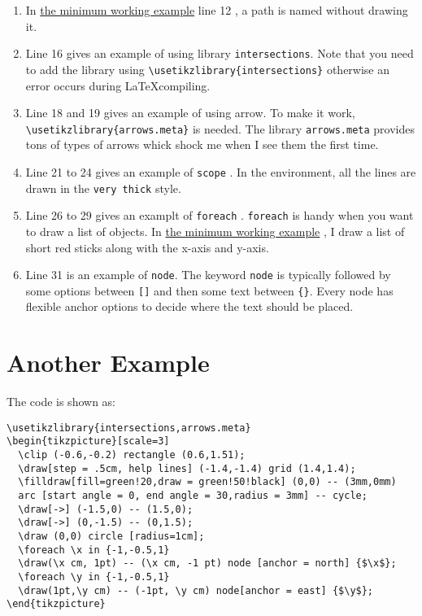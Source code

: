 \documentclass[koma,utopia,a4paper,captions=tableheading,11pt,listings-sv,microtype,paralist,colorlinks=true,urlcolor=blue]{org-article}
\begin{document}
\begin{enumerate}
\item In \hyperref[a-minimum-working-example]{the minimum working example} line 12 , a path is named  without drawing
it.
\item Line 16 gives an example of using library \texttt{intersections}. Note
that you need to add the library using \texttt{\textbackslash{}usetikzlibrary\{intersections\}}
otherwise an error occurs during \LaTeX compiling.
\item Line 18 and 19 gives an example of using arrow. To make it work,
\texttt{\textbackslash{}usetikzlibrary\{arrows.meta\}} is needed. The library \texttt{arrows.meta} provides tons
of types of arrows whick shock me when I see them the first time.
\item Line 21 to 24 gives an example of \texttt{scope} . In the environment, all
the lines are drawn in the \texttt{very thick} style.
\item Line 26 to 29 gives an examplt of \texttt{foreach} . \texttt{foreach} is handy
when you want to draw a list of objects. In \hyperref[a-minimum-working-example]{the minimum working example} , I
draw a list of short red sticks along with the x-axis and y-axis.
\item Line 31 is an example of \texttt{node}. The keyword \texttt{node} is typically followed by
some options between \texttt{[]} and then some text between \texttt{\{\}}. Every node has flexible
anchor options to decide where the text should be placed.
\end{enumerate}
\section{Another Example}
\label{sec:orgc5e5c7a}


The code is shown as:
\begin{lstlisting}
\usetikzlibrary{intersections,arrows.meta}
\begin{tikzpicture}[scale=3]
  \clip (-0.6,-0.2) rectangle (0.6,1.51);
  \draw[step = .5cm, help lines] (-1.4,-1.4) grid (1.4,1.4);
  \filldraw[fill=green!20,draw = green!50!black] (0,0) -- (3mm,0mm)
  arc [start angle = 0, end angle = 30,radius = 3mm] -- cycle;
  \draw[->] (-1.5,0) -- (1.5,0);
  \draw[->] (0,-1.5) -- (0,1.5);
  \draw (0,0) circle [radius=1cm];
  \foreach \x in {-1,-0.5,1}
  \draw(\x cm, 1pt) -- (\x cm, -1 pt) node [anchor = north] {$\x$};
  \foreach \y in {-1,-0.5,1}
  \draw(1pt,\y cm) -- (-1pt, \y cm) node[anchor = east] {$\y$};
\end{tikzpicture}
\end{lstlisting}
\end{document}
